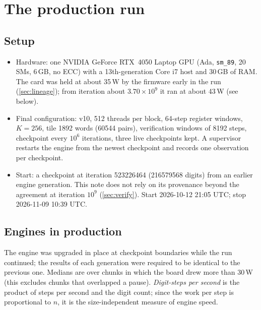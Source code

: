 \documentclass[11pt,a4paper]{article}
\newcommand{\code}[1]{\texttt{\small #1}}
\theoremstyle{remark}
\begin{document}
\section{The production run}\label{sec:run}

\subsection{Setup}
\begin{itemize}
\item Hardware: one NVIDIA GeForce RTX~4050 Laptop GPU (Ada, \code{sm\_89}, 20 SMs, 6\,GB, no ECC) with a 13th-generation Core i7 host and 30\,GB of RAM. The card was held at about 35\,W by the firmware early in the run (\cref{sec:lineage}); from iteration about $3.70\times10^9$ it ran at about 43\,W (see below).
\item Final configuration: v10, 512 threads per block, 64-step register windows, $K=256$, tile 1892 words (\num{60544} pairs), verification windows of \num{8192} steps, checkpoint every $10^6$ iterations, three live checkpoints kept. A supervisor restarts the engine from the newest checkpoint and records one observation per checkpoint.
\item Start: a checkpoint at iteration \num{523226464} (\num{216579568} digits) from an earlier engine generation. This note does not rely on its provenance beyond the agreement at iteration $10^9$ (\cref{sec:verify}). Start 2026-10-12 21:05 UTC; stop 2026-11-09 10:39 UTC.
\end{itemize}

\subsection{Engines in production}

The engine was upgraded in place at checkpoint boundaries while the run continued; the results of each generation were required to be identical to the previous one. Medians are over chunks in which the board drew more than 30\,W (this excludes chunks that overlapped a pause). \emph{Digit-steps per second} is the product of steps per second and the digit count; since the work per step is proportional to $n$, it is the size-independent measure of engine speed.
\end{document}
